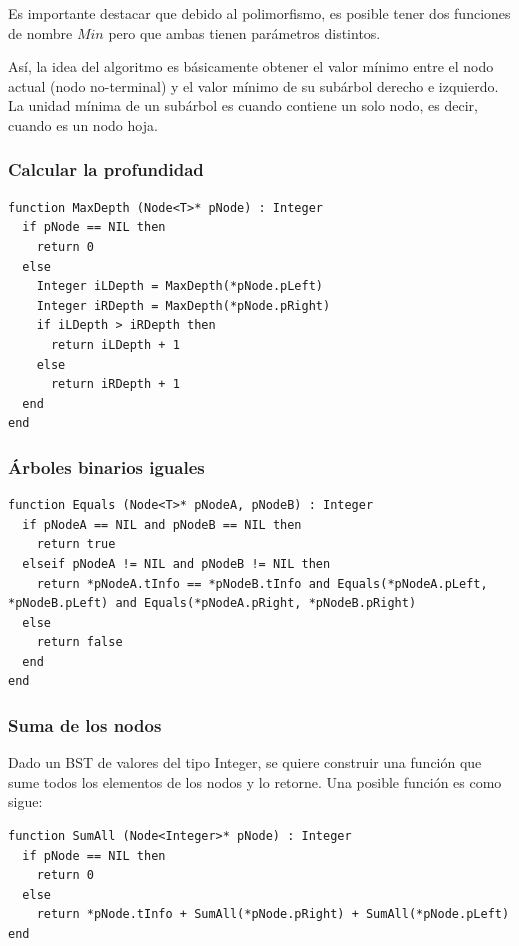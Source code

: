 Es importante destacar que debido al polimorfismo, es posible tener dos funciones de nombre $Min$ pero que ambas tienen parámetros distintos.

Así, la idea del algoritmo es básicamente obtener el valor mínimo entre el nodo actual (nodo no-terminal) y el valor mínimo de su subárbol derecho e izquierdo. La unidad mínima de un subárbol es cuando contiene un solo nodo, es decir, cuando es un nodo hoja.

\subsubsection{Calcular la profundidad}

\begin{lstlisting}[upquote=true, language=pseudo]
function MaxDepth (Node<T>* pNode) : Integer
  if pNode == NIL then
    return 0
  else
    Integer iLDepth = MaxDepth(*pNode.pLeft)
    Integer iRDepth = MaxDepth(*pNode.pRight)
    if iLDepth > iRDepth then
      return iLDepth + 1
    else
      return iRDepth + 1
  end
end
\end{lstlisting}

\subsubsection{Árboles binarios iguales}

\begin{lstlisting}[upquote=true, language=pseudo]
function Equals (Node<T>* pNodeA, pNodeB) : Integer
  if pNodeA == NIL and pNodeB == NIL then
    return true
  elseif pNodeA != NIL and pNodeB != NIL then
    return *pNodeA.tInfo == *pNodeB.tInfo and Equals(*pNodeA.pLeft, *pNodeB.pLeft) and Equals(*pNodeA.pRight, *pNodeB.pRight)
  else
    return false
  end
end
\end{lstlisting}

\subsubsection{Suma de los nodos}

Dado un BST de valores del tipo Integer, se quiere construir una función que sume todos los elementos de los nodos y lo retorne. Una posible función es como sigue:

\begin{lstlisting}[upquote=true, language=pseudo]
function SumAll (Node<Integer>* pNode) : Integer
  if pNode == NIL then
    return 0
  else
    return *pNode.tInfo + SumAll(*pNode.pRight) + SumAll(*pNode.pLeft)
end
\end{lstlisting}

